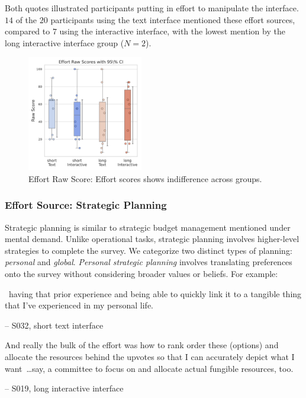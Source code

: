 Both quotes illustrated participants putting in effort to manipulate the interface. $14$ of the $20$ participants using the text interface mentioned these effort sources, compared to $7$ using the interactive interface, with the lowest mention by the long interactive interface group ($N=2$).


\begin{figure} %
    \centering
    \includegraphics[width=0.45\textwidth, trim=0 13 0 13, clip]{content/image/cog/Effort_scores.pdf}
    \captionsetup{width=0.40\textwidth, justification=justified} %
    \caption{Effort Raw Score: Effort scores shows indifference across groups.}
    \label{fig:effort_cog_score}
\end{figure}


\subsubsection{Effort Source: Strategic Planning}
Strategic planning is similar to strategic budget management mentioned under mental demand. Unlike operational tasks, strategic planning involves higher-level strategies to complete the survey. We categorize two distinct types of planning: \textit{personal} and \textit{global}. \textit{Personal strategic planning} involves translating preferences onto the survey without considering broader values or beliefs. For example:

\begin{displayquote}
~\bracketellipsis having that prior experience and being able to quickly link it to a tangible thing that I've experienced in my personal life.

\noindent \hfill -- S032, short text interface
\end{displayquote}

\begin{displayquote}
And really the bulk of the effort was how to rank order these (options) and allocate the resources behind the upvotes so that I can accurately depict what I want~\ldots say, a committee to focus on and allocate actual fungible resources, too. 

\noindent \hfill -- S019, long interactive interface
\end{displayquote}


